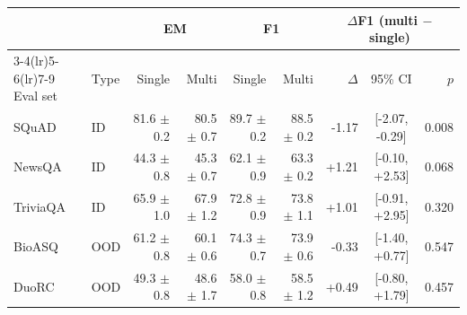 \begin{tabular}{llrrrrrcr}
\toprule
 & & \multicolumn{2}{c}{EM} & \multicolumn{2}{c}{F1} & \multicolumn{3}{c}{$\Delta$F1 (multi $-$ single)} \\
\cmidrule(lr){3-4}\cmidrule(lr){5-6}\cmidrule(lr){7-9}
Eval set & Type & Single & Multi & Single & Multi & $\Delta$ & 95\% CI & $p$ \\
\midrule
SQuAD & ID & 81.6 $\pm$ 0.2 & 80.5 $\pm$ 0.7 & 89.7 $\pm$ 0.2 & 88.5 $\pm$ 0.2 & -1.17 & [-2.07, -0.29] & 0.008 \\
NewsQA & ID & 44.3 $\pm$ 0.8 & 45.3 $\pm$ 0.7 & 62.1 $\pm$ 0.9 & 63.3 $\pm$ 0.2 & +1.21 & [-0.10, +2.53] & 0.068 \\
TriviaQA & ID & 65.9 $\pm$ 1.0 & 67.9 $\pm$ 1.2 & 72.8 $\pm$ 0.9 & 73.8 $\pm$ 1.1 & +1.01 & [-0.91, +2.95] & 0.320 \\
BioASQ & OOD & 61.2 $\pm$ 0.8 & 60.1 $\pm$ 0.6 & 74.3 $\pm$ 0.7 & 73.9 $\pm$ 0.6 & -0.33 & [-1.40, +0.77] & 0.547 \\
DuoRC & OOD & 49.3 $\pm$ 0.8 & 48.6 $\pm$ 1.7 & 58.0 $\pm$ 0.8 & 58.5 $\pm$ 1.2 & +0.49 & [-0.80, +1.79] & 0.457 \\
\bottomrule
\end{tabular}
